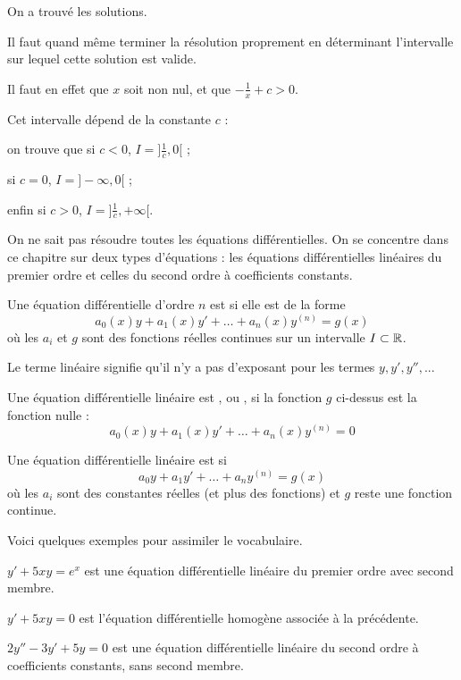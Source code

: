 On a trouvé les solutions.

\change
Il faut quand même terminer la résolution proprement 
en déterminant l'intervalle 
sur lequel cette solution est valide.

Il faut en effet que $x$ soit non nul, et que $-\frac{1}{x}+c>0$.

\change

Cet intervalle dépend de la constante $c$ :

on trouve que si $c<0$, $I=]\frac1c,0[$ ; 

si $c=0$, $I=]-\infty,0[$ ; 

enfin si $c>0$, $I=]\frac1c,+\infty[$.


\diapo


On ne sait pas résoudre toutes les équations différentielles.
On se concentre dans ce chapitre sur deux types d'équations : les équations différentielles
linéaires du premier ordre et celles du second ordre à coefficients constants.

Une équation différentielle d'ordre $n$ est  si elle est de la forme
$$a_0(x)y+a_1(x)y'+\dots +a_n(x)y^{(n)} = g(x)$$
où les $a_i$ et $g$ sont des fonctions réelles continues sur un intervalle $I\subset \mathbb{R}$.

Le terme linéaire signifie qu'il n'y a pas d'exposant pour les termes $y,y',y'',...$

\change  
Une équation différentielle linéaire est , ou ,
  si la fonction $g$ ci-dessus est la fonction nulle :
  $$a_0(x)y+a_1(x)y'+\dots +a_n(x)y^{(n)} = 0$$

\change   
Une équation différentielle linéaire est  si
  $$a_0y+a_1y'+\dots +a_ny^{(n)} = g(x)$$
  où les $a_i$ sont des constantes réelles (et plus des fonctions) 
  et $g$ reste une fonction continue.
  
  

\diapo

Voici quelques exemples pour assimiler le vocabulaire.

$y' + 5xy = e^x$ est une équation différentielle linéaire du premier ordre avec second membre.

\change
$y' + 5xy = 0$ est l'équation différentielle homogène associée à la précédente.

\change
$2y'' - 3y' + 5y = 0$ est une équation différentielle linéaire du second ordre à coefficients constants,
  sans second membre.
  
